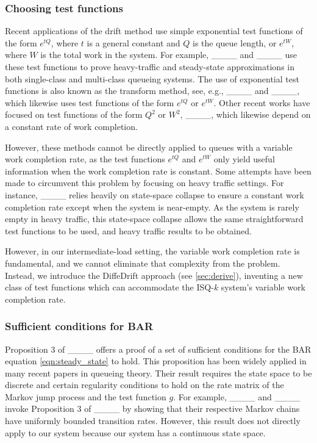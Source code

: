 \subsubsection{Choosing test functions}

Recent applications of the drift method use simple exponential test functions of the form $e^{tQ}$, where $t$ is a general constant and $Q$ is the queue length, or $e^{tW}$, where $W$ is the total work in the system. For example, ____ and ____ use these test functions to prove
heavy-traffic and steady-state approximations in both single-class and multi-class queueing systems. The use of exponential test functions is also known as the transform method, see, e.g., ____ and ____, which likewise uses test functions of the form $e^{tQ}$ or $e^{tW}$. Other recent works have focused on test functions of the form $Q^2$ or $W^2$, ____, which  likewise depend on a constant rate of work completion.

However, these methods cannot be directly applied to queues with a variable work completion rate, as the test functions $e^{tQ}$ and $e^{tW}$ only yield useful information when the work completion rate is constant. Some attempts have been made to circumvent this problem by focusing on heavy traffic settings. For instance, ____ relies heavily on state-space collapse to ensure a constant work completion rate except when the system is near-empty. As the system is rarely empty in heavy traffic, this state-space collapse allows the same straightforward test functions to be used, and heavy traffic results to be obtained.

However, in our intermediate-load setting, the variable work completion rate is fundamental, and we cannot eliminate that complexity from the problem. Instead, we introduce the DiffeDrift approach (see \cref{sec:derive}), inventing a new class of test functions which can accommodate the ISQ-$k$ system's variable work completion rate.


\subsubsection{Sufficient conditions for BAR} Proposition 3 of ____ offers a proof of a set of sufficient conditions for the BAR equation \eqref{eqn:steady_state} to hold. This proposition has been widely applied in many recent papers in queueing theory. Their result requires the state space to be discrete and certain regularity conditions to hold on the rate matrix of the Markov jump process and the test function $g$. For example, ____ and ____ invoke Proposition 3 of ____ by showing that their respective Markov chains have uniformly bounded transition rates. However, this result does not directly apply to our system because our system has a continuous state space.


